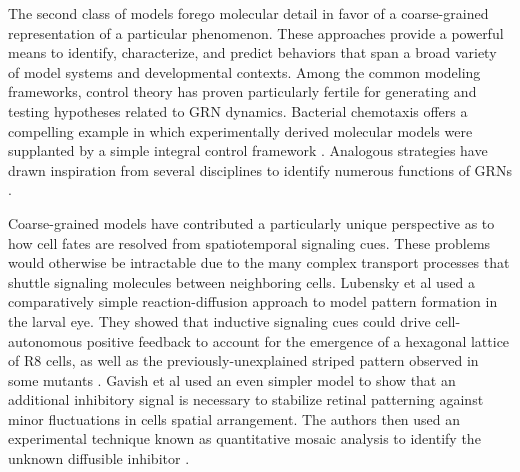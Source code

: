 The second class of models forego molecular detail in favor of a coarse-grained representation of a particular phenomenon. These approaches provide a powerful means to identify, characterize, and predict behaviors that span a broad variety of model systems and developmental contexts. Among the common modeling frameworks, control theory has proven particularly fertile for generating and testing hypotheses related to GRN dynamics. Bacterial chemotaxis offers a compelling example in which experimentally derived molecular models were supplanted by a simple integral control framework \cite{Barkai1997b,Alon1999,Yi2000,Muzzey2009}. Analogous strategies have drawn inspiration from several disciplines to identify numerous functions of GRNs \cite{Ma2009,Colman-Lerner2005,Rahimi2016,Benzinger2018,Adler2018,Yordanov2018}.

Coarse-grained models have contributed a particularly unique perspective as to how cell fates are resolved from spatiotemporal signaling cues. These problems would otherwise be intractable due to the many complex transport processes that shuttle signaling molecules between neighboring cells. Lubensky et al used a comparatively simple reaction-diffusion approach to model pattern formation in the larval eye. They showed that inductive signaling cues could drive cell-autonomous positive feedback to account for the emergence of a hexagonal lattice of R8 cells, as well as the previously-unexplained striped pattern observed in some mutants \cite{Lubensky2011}. Gavish et al used an even simpler model to show that an additional inhibitory signal is necessary to stabilize retinal patterning against minor fluctuations in cells spatial arrangement. The authors then used an experimental technique known as quantitative mosaic analysis to identify the unknown diffusible inhibitor \cite{Gavish2016}.

